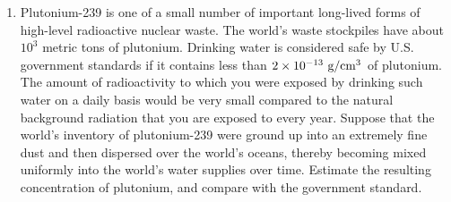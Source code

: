 \begin{enumerate}



\vspace{1.5mm}

\item 
Plutonium-239 is one of a small number of important long-lived forms of high-level
radioactive nuclear waste. The world's waste stockpiles have about $10^3$ metric tons
of plutonium. Drinking water is considered safe by U.S. government standards if it
contains less than $2\times10^{-13}\ \textup{g}/\textup{cm}^3$ of plutonium.
The amount of radioactivity to which you were exposed by drinking such water
on a daily basis would be very small compared to the natural background radiation that you are
exposed to every year. Suppose that the world's inventory of plutonium-239 were ground
up into an extremely fine dust and then dispersed over the world's oceans, thereby
becoming mixed uniformly into the world's water supplies over time.
Estimate the resulting concentration of plutonium, and compare with the government standard.

\end{enumerate}


